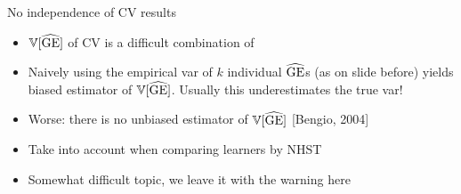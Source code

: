 \documentclass[11pt,compress,t,notes=noshow, xcolor=table]{beamer}
\begin{document}
\begin{vbframe}{No independence of CV results}

\begin{itemize}
\item $\mathbb{V}[\widehat{\mathrm{GE}}]$ of CV is a difficult combination of 
\begin{itemize}
\end{itemize}
\item Naively using the empirical var of $k$ individual $\widehat{\mathrm{GE}}$s (as on slide before) yields biased 
estimator of $\mathbb{V}[\widehat{\mathrm{GE}}]$. Usually this underestimates the true var!
\item Worse: there is no unbiased estimator of $\mathbb{V}[\widehat{\mathrm{GE}}]$ [Bengio, 2004]
\item Take into account when comparing learners by NHST
\item Somewhat difficult topic, we leave it with the warning here
\end{itemize}

\end{vbframe}






\end{document}
